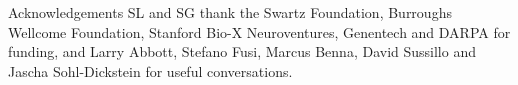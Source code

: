 \documentclass[final,hyperref={pdfpagelabels=false,bookmarks=false}]{beamer}
\begin{document}
\begin{frame}{}
\begin{columns}[t]
\begin{column}{0.32\linewidth}

\begin{block}{Acknowledgements}
%
 SL and SG thank the Swartz Foundation, Burroughs Wellcome Foundation, Stanford Bio-X Neuroventures, Genentech and DARPA for funding, and Larry Abbott, Stefano Fusi, Marcus Benna, David Sussillo and Jascha Sohl-Dickstein for useful conversations.

%
\end{block}


\end{column}





\end{columns}

\end{frame}
\end{document}
